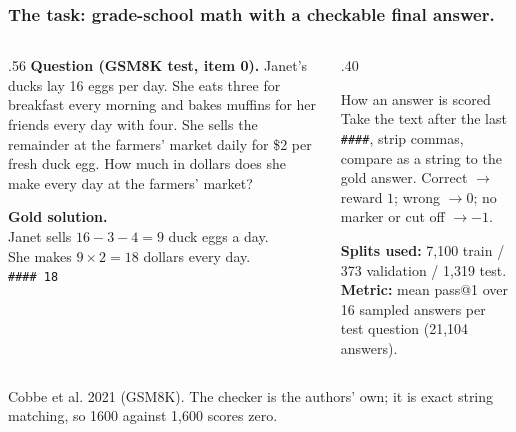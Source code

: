 \documentclass[aspectratio=169,11pt]{beamer}
\newcommand{\source}[1]{\vfill{\scriptsize\color{Gray}#1\par}}
\begin{document}
\begin{frame}[t]
\frametitle{The task: grade-school math with a checkable final answer.}
\begin{columns}[T,onlytextwidth]
\begin{column}{.56\textwidth}
\small
\textbf{Question (GSM8K test, item 0).} Janet's ducks lay 16 eggs per day. She eats three for
breakfast every morning and bakes muffins for her friends every day with four. She sells the
remainder at the farmers' market daily for \$2 per fresh duck egg. How much in dollars does she
make every day at the farmers' market?
\medskip

\textbf{Gold solution.}\\
Janet sells $16-3-4=9$ duck eggs a day.\\
She makes $9\times 2=18$ dollars every day.\\
\texttt{\#\#\#\# 18}
\end{column}
\begin{column}{.40\textwidth}
\begin{block}{How an answer is scored}
Take the text after the last \texttt{\#\#\#\#}, strip commas, compare as a string to the gold
answer. Correct $\to$ reward $1$; wrong $\to 0$; no marker or cut off $\to -1$.
\end{block}
\medskip
\textbf{Splits used:} 7,100 train / 373 validation / 1,319 test.\\[1mm]
\textbf{Metric:} mean pass@1 over 16 sampled answers per test question (21,104 answers).
\end{column}
\end{columns}
\source{Cobbe et al. 2021 (GSM8K). The checker is the authors' own; it is exact string matching, so 1600 against 1,600 scores zero.}
\end{frame}
\end{document}
